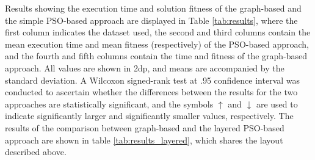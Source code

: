 \documentclass{llncs}
\begin{document}
Results showing the execution time and solution fitness of the graph-based and the simple PSO-based approach are displayed in Table \ref{tab:results}, where the first column indicates the dataset used, the second and third columns contain the mean execution time and mean fitness (respectively) of the PSO-based approach, and the fourth and fifth columns contain the time and fitness of the graph-based approach. All values are shown in 2dp, and means are accompanied by the standard deviation. A Wilcoxon signed-rank test at .95 confidence interval was conducted to ascertain whether the differences between the results for the two approaches are statistically significant, and the symbols $\uparrow$ and $\downarrow$ are used to indicate significantly larger and significantly smaller values, respectively. The results of the comparison between graph-based and the layered PSO-based approach are shown in table \ref{tab:results_layered}, which shares the layout described above.
\end{document}
